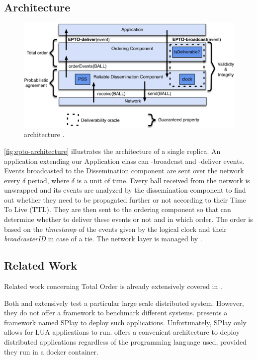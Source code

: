 \subsection{\epto Architecture}
\begin{figure}[htp]
	\includegraphics[width=\linewidth]{figures/architecture.pdf}
	\caption{\epto architecture \autocite{matos2015epto}.}
	\label{fig:epto-architecture}
\end{figure}
\autoref{fig:epto-architecture} illustrates the architecture of a single \epto replica. An application extending our Application class can \epto-broadcast and \epto-deliver events. Events broadcasted to the Dissemination component are sent over the network every $\delta$ period, where $\delta$ is a unit of time. Every ball received from the network is unwrapped and its events are analyzed by the dissemination component to find out whether they need to be propagated further or not according to their Time To Live (TTL). They are then sent to the ordering component so that \epto can determine whether to deliver these events or not and in which order. The order is based on the \textit{timestamp} of the events given by the logical clock and their \textit{broadcasterID} in case of a tie. The network layer is managed by \eptotester.
\subsection{Related Work}
Related work concerning Total Order is already extensively covered in \autocite{matos2015epto}. 

Both \autocite{Chandra2007} and \autocite{Maia2011} extensively test a particular large scale distributed system. However, they do not offer a framework to benchmark different systems. \autocite{Leonini2009} presents a framework named SPlay to deploy such applications. Unfortunately, SPlay only allows for LUA applications to run. \eptotester offers a convenient architecture to deploy distributed applications regardless of the programming language used, provided they run in a docker container.
